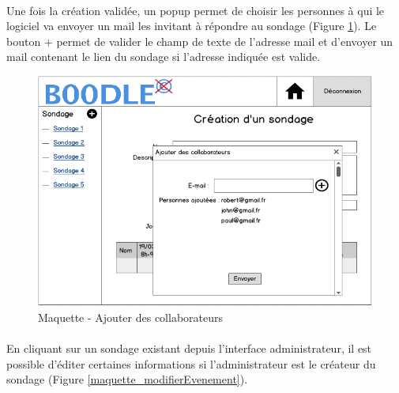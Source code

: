 \documentclass[]{report}
\begin{document}
\paragraph{}Une fois la création validée, un popup permet de choisir les personnes à qui le logiciel va envoyer un mail les invitant à répondre au sondage (Figure \ref{maquette_popupAddParticipants}). Le bouton + permet de valider le champ de texte de l'adresse mail et d'envoyer un mail contenant le lien du sondage si l'adresse indiquée est valide.

\begin{figure}[h]
	\caption{Maquette - Ajouter des collaborateurs}
	\label{maquette_popupAddParticipants}
	\centering
	\includegraphics[scale=0.7]{figures/maquettes/popupAddParticipants.png}
\end{figure}

\paragraph{}En cliquant sur un sondage existant depuis l'interface administrateur, il est possible d'éditer certaines informations si l'administrateur est le créateur du sondage (Figure \ref{maquette_modifierEvenement}).
\end{document}

